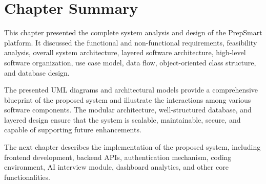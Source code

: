 \section{Chapter Summary}

This chapter presented the complete system analysis and design of the PrepSmart platform. It discussed the functional and non-functional requirements, feasibility analysis, overall system architecture, layered software architecture, high-level software organization, use case model, data flow, object-oriented class structure, and database design.

The presented UML diagrams and architectural models provide a comprehensive blueprint of the proposed system and illustrate the interactions among various software components. The modular architecture, well-structured database, and layered design ensure that the system is scalable, maintainable, secure, and capable of supporting future enhancements.

The next chapter describes the implementation of the proposed system, including frontend development, backend APIs, authentication mechanism, coding environment, AI interview module, dashboard analytics, and other core functionalities.